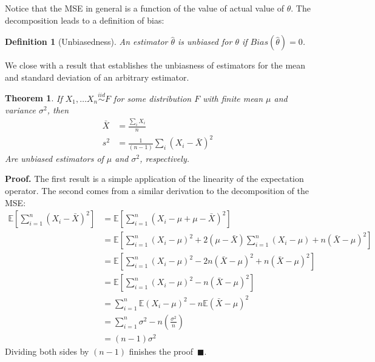 \documentclass{tufte-handout}
\newtheorem{mydef}{Definition}
\newtheorem{thm}{Theorem}
\newcommand{\iid}{\stackrel{iid}{\sim}}
\begin{document}
Notice that the MSE in general is a function of the value of actual value
of $\theta$. The decomposition leads to a definition of bias:

\begin{mydef}[Unbiasedness]
An estimator $\widehat{\theta}$ is unbiased for $\theta$ if
$Bias(\widehat{\theta}) = 0$.
\end{mydef}

We close with a result that establishes the unbiasness of estimators
for the mean and standard deviation of an arbitrary estimator.

\begin{thm}
If $X_1, \ldots X_n \iid F$ for some distribution $F$ with
finite mean $\mu$ and variance $\sigma^2$, then
\begin{align*}
\bar{X} &= \frac{\sum_i X_i}{n} \\
s^2 &= \frac{1}{(n-1)} \sum_i (X_i - \bar{X})^2
\end{align*}
Are unbiased estimators of $\mu$ and $\sigma^2$, respectively.
\end{thm}
\textbf{Proof.} The first result is a simple application of the linearity
of the expectation operator. The second comes from a similar derivation
to the decomposition of the MSE:
\begin{align*}
\mathbb{E} \left[ \sum_{i=1}^n (X_i - \bar{X})^2 \right]
  &= \mathbb{E} \left[ \sum_{i=1}^n (X_i - \mu + \mu  - \bar{X})^2 \right] \\
  &= \mathbb{E} \left[ \sum_{i=1}^n (X_i - \mu)^2 + 2 (\mu - \bar{X}) \sum_{i=1}^n (X_i - \mu) + n (\bar{X} - \mu)^2 \right] \\
  &= \mathbb{E} \left[ \sum_{i=1}^n (X_i - \mu)^2 - 2 n (\bar{X} - \mu)^2 + n (\bar{X} - \mu)^2 \right] \\
  &= \mathbb{E} \left[ \sum_{i=1}^n (X_i - \mu)^2 - n (\bar{X} - \mu)^2 \right] \\
  &= \sum_{i=1}^n \mathbb{E}(X_i - \mu)^2 - n \mathbb{E} (\bar{X} - \mu)^2 \\
  &= \sum_{i=1}^n \sigma^2 - n \left( \frac{\sigma^2}{n} \right) \\
  &= (n-1)\sigma^2
\end{align*}
Dividing both sides by $(n-1)$ finishes the proof~$\blacksquare$.
\end{document}

